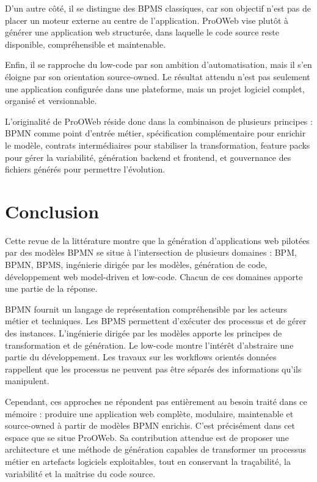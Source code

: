 \documentclass[12pt,a4paper]{article}
\begin{document}
D'un autre côté, il se distingue des BPMS classiques, car son objectif n'est pas de placer un moteur externe au centre de l'application. ProOWeb vise plutôt à générer une application web structurée, dans laquelle le code source reste disponible, compréhensible et maintenable.

Enfin, il se rapproche du low-code par son ambition d'automatisation, mais il s'en éloigne par son orientation source-owned. Le résultat attendu n'est pas seulement une application configurée dans une plateforme, mais un projet logiciel complet, organisé et versionnable.

L'originalité de ProOWeb réside donc dans la combinaison de plusieurs principes : BPMN comme point d'entrée métier, spécification complémentaire pour enrichir le modèle, contrats intermédiaires pour stabiliser la transformation, feature packs pour gérer la variabilité, génération backend et frontend, et gouvernance des fichiers générés pour permettre l'évolution.

\section{Conclusion}

Cette revue de la littérature montre que la génération d'applications web pilotées par des modèles BPMN se situe à l'intersection de plusieurs domaines : BPM, BPMN, BPMS, ingénierie dirigée par les modèles, génération de code, développement web model-driven et low-code. Chacun de ces domaines apporte une partie de la réponse.

BPMN fournit un langage de représentation compréhensible par les acteurs métier et techniques. Les BPMS permettent d'exécuter des processus et de gérer des instances. L'ingénierie dirigée par les modèles apporte les principes de transformation et de génération. Le low-code montre l'intérêt d'abstraire une partie du développement. Les travaux sur les workflows orientés données rappellent que les processus ne peuvent pas être séparés des informations qu'ils manipulent.

Cependant, ces approches ne répondent pas entièrement au besoin traité dans ce mémoire : produire une application web complète, modulaire, maintenable et source-owned à partir de modèles BPMN enrichis. C'est précisément dans cet espace que se situe ProOWeb. Sa contribution attendue est de proposer une architecture et une méthode de génération capables de transformer un processus métier en artefacts logiciels exploitables, tout en conservant la traçabilité, la variabilité et la maîtrise du code source.
\end{document}

